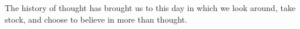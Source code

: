 

The history of thought has brought us to this day in which we look
around, take stock, and choose to believe in more than thought.

\bye

